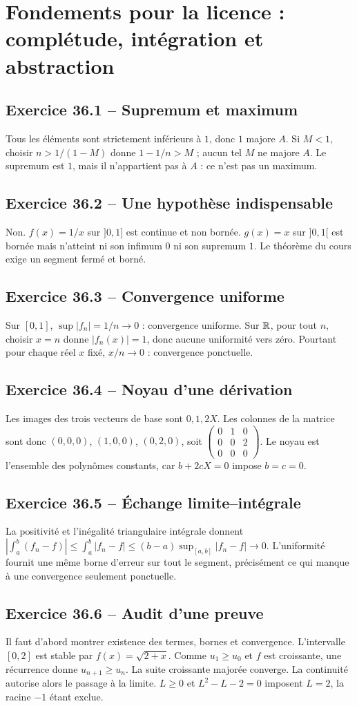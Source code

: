 \chapter{Fondements pour la licence : complétude, intégration et abstraction}
\section*{Exercice 36.1 -- Supremum et maximum}
Tous les éléments sont strictement inférieurs à $1$, donc $1$ majore $A$. Si $M<1$, choisir $n>1/(1-M)$ donne $1-1/n>M$ ; aucun tel $M$ ne majore $A$. Le supremum est $1$, mais il n'appartient pas à $A$ : ce n'est pas un maximum.

\section*{Exercice 36.2 -- Une hypothèse indispensable}
Non. $f(x)=1/x$ sur $]0,1]$ est continue et non bornée. $g(x)=x$ sur $]0,1[$ est bornée mais n'atteint ni son infimum $0$ ni son supremum $1$. Le théorème du cours exige un segment fermé et borné.

\section*{Exercice 36.3 -- Convergence uniforme}
Sur $[0,1]$, $\sup|f_n|=1/n\to0$ : convergence uniforme. Sur $\mathbb{R}$, pour tout $n$, choisir $x=n$ donne $|f_n(x)|=1$, donc aucune uniformité vers zéro. Pourtant pour chaque réel $x$ fixé, $x/n\to0$ : convergence ponctuelle.

\section*{Exercice 36.4 -- Noyau d’une dérivation}
Les images des trois vecteurs de base sont $0,1,2X$. Les colonnes de la matrice sont donc $(0,0,0)$, $(1,0,0)$, $(0,2,0)$, soit $\begin{pmatrix}0&1&0\\0&0&2\\0&0&0\end{pmatrix}$. Le noyau est l'ensemble des polynômes constants, car $b+2cX=0$ impose $b=c=0$.

\section*{Exercice 36.5 -- Échange limite–intégrale}
La positivité et l'inégalité triangulaire intégrale donnent $|\int_a^b(f_n-f)|\le\int_a^b|f_n-f|\le(b-a)\sup_{[a,b]}|f_n-f|\to0$. L'uniformité fournit une même borne d'erreur sur tout le segment, précisément ce qui manque à une convergence seulement ponctuelle.

\section*{Exercice 36.6 -- Audit d’une preuve}
Il faut d'abord montrer existence des termes, bornes et convergence. L'intervalle $[0,2]$ est stable par $f(x)=\sqrt{2+x}$. Comme $u_1\ge u_0$ et $f$ est croissante, une récurrence donne $u_{n+1}\ge u_n$. La suite croissante majorée converge. La continuité autorise alors le passage à la limite. $L\ge0$ et $L^2-L-2=0$ imposent $L=2$, la racine $-1$ étant exclue.
